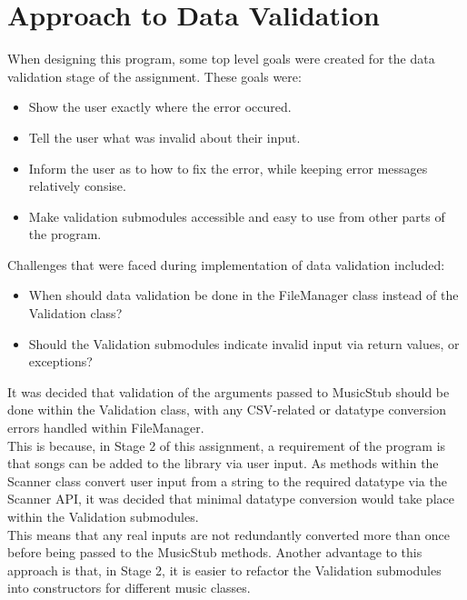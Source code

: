 \documentclass{article}
\begin{document}
    \section{Approach to Data Validation}
    When designing this program, some top level goals were
    created for the data validation stage of the assignment. These goals were:
    \begin{itemize}
        \item Show the user exactly where the error occured.
        \item Tell the user what was invalid about their input.
        \item Inform the user as to how to fix the error,
            while keeping error messages relatively consise.
        \item Make validation submodules accessible and easy
            to use from other parts of the program.
    \end{itemize}
    Challenges that were faced during implementation of data validation included:
    \begin{itemize}
        \item When should data validation be done in the
            FileManager class instead of the Validation class?
        \item Should the Validation submodules indicate invalid input via return values, or exceptions?
    \end{itemize}
    It was decided that validation of the arguments passed to MusicStub should be done within
        the Validation class, with any CSV-related or datatype conversion errors handled within
        FileManager.\\
    This is because, in Stage 2 of this assignment, a requirement of the program
        is that songs can be added to the library via user input.
    As methods within the Scanner class convert user input from a string to
        the required datatype via the Scanner API, it was decided that minimal datatype
        conversion would take place within the Validation submodules.\\
    This means that any real inputs are not redundantly converted more than once
        before being passed to the MusicStub methods.
    Another advantage to this approach is that, in Stage 2, it is easier to refactor
        the Validation submodules into constructors for different music classes.\\\\
\end{document}
